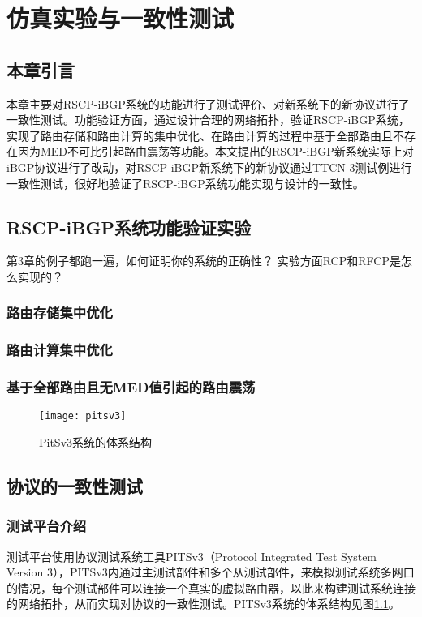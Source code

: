 \chapter{仿真实验与一致性测试}
\label{cha:evaluate}


\section{本章引言}
本章主要对RSCP-iBGP系统的功能进行了测试评价、对新系统下的新协议进行了一致性测试。功能验证方面，通过设计合理的网络拓扑，验证RSCP-iBGP系统，实现了路由存储和路由计算的集中优化、在路由计算的过程中基于全部路由且不存在因为MED不可比引起路由震荡等功能。本文提出的RSCP-iBGP新系统实际上对iBGP协议进行了改动，对RSCP-iBGP新系统下的新协议通过TTCN-3测试例进行一致性测试，很好地验证了RSCP-iBGP系统功能实现与设计的一致性。

\section{RSCP-iBGP系统功能验证实验}

第3章的例子都跑一遍，如何证明你的系统的正确性？
实验方面RCP和RFCP是怎么实现的？

\subsection{路由存储集中优化}

\subsection{路由计算集中优化}

\subsection{基于全部路由且无MED值引起的路由震荡}


\begin{figure}
  \centering
  \texttt{[image: pitsv3]}
  \caption{PitSv3系统的体系结构\cite{pitsv3}}
  \label{fig:pitsv3}
\end{figure}


\section{协议的一致性测试}
\subsection{测试平台介绍}
测试平台使用协议测试系统工具PITSv3\cite{pitsv3}（Protocol Integrated Test System Version 3），PITSv3内通过主测试部件和多个从测试部件，来模拟测试系统多网口的情况，每个测试部件可以连接一个真实的虚拟路由器，以此来构建测试系统连接的网络拓扑，从而实现对协议的一致性测试。PITSv3系统的体系结构见图\ref{fig:pitsv3}。

